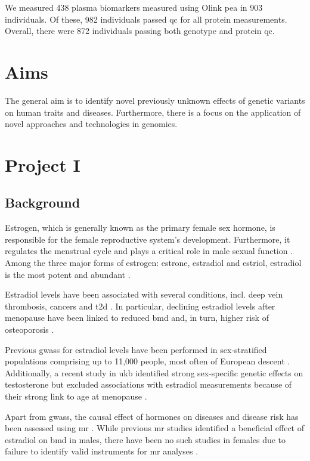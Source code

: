 \documentclass[draft]{scrbook}
\begin{document}
We measured 438 plasma biomarkers measured using Olink \gls{pea} in 903 individuals.
Of these, 982 individuals passed \gls{qc} for all protein measurements.
Overall, there were 872 individuals passing both genotype and protein \gls{qc}.

\chapter{Aims}
The general aim is to identify novel previously unknown effects of genetic variants on human traits and diseases.
Furthermore, there is a focus on the application of novel approaches and technologies in genomics.

\chapter{Project I}
\section{Background}
Estrogen, which is generally known as the primary female sex hormone, is responsible for the female reproductive system's development.
Furthermore, it regulates the menstrual cycle and plays a critical role in male sexual function \cite{Bates2013b,Hess1997b}. 
Among the three major forms of estrogen: estrone, estradiol and estriol, estradiol is the most potent and abundant \cite{Thomas2013c}.

Estradiol levels have been associated with several conditions, incl. deep vein thrombosis, cancers and \gls{t2d} \cite{Cauley1999a, Rosendaal2003b,Vikan2010}.
In particular, declining estradiol levels after menopause have been linked to reduced \gls{bmd} and, in turn, higher risk of osteoporosis \cite{Riggs1998a,Longo2012a}.

Previous \glspl{gwas} for estradiol levels have been performed in sex-stratified populations comprising up to 11,000 people, most often of European descent \cite{Pott2019e,Chen2013d,Liu2013b,Prescott2012f,Eriksson2018b}.
Additionally, a recent study in \gls{ukb} identified strong sex-specific genetic effects on testosterone but excluded associations with estradiol measurements because of their strong link to age at menopause \cite{Ruth2020d}.

Apart from \glspl{gwas}, the causal effect of hormones on diseases and disease risk has been assessed using \gls{mr} \cite{Eriksson2018b,Ruth2020d, Nethander2018a}.
While previous \gls{mr} studies identified a beneficial effect of estradiol on \gls{bmd} in males, there have been no such studies in females due to failure to identify valid instruments for \gls{mr} analyses \cite{Eriksson2018b, Nethander2018a}.
\end{document}
